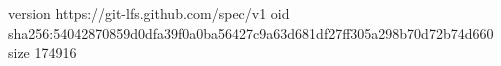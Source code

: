 version https://git-lfs.github.com/spec/v1
oid sha256:54042870859d0dfa39f0a0ba56427c9a63d681df27ff305a298b70d72b74d660
size 174916
